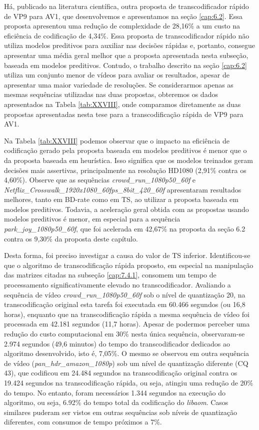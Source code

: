 Há, publicado na literatura científica, outra proposta de transcodificador rápido de VP9 para AV1, que desenvolvemos e apresentamos na seção \ref{cap:6.2}. Essa proposta apresentou uma redução de complexidade de 28,16\% a um custo na eficiência de codificação de 4,34\%. Essa proposta de transcodificador rápido não utiliza modelos preditivos para auxiliar nas decisões rápidas e, portanto, consegue apresentar uma média geral melhor que a proposta apresentada nesta subseção, baseada em modelos preditivos. Contudo, o trabalho descrito na seção \ref{cap:6.2} utiliza um conjunto menor de vídeos para avaliar os resultados, apesar de apresentar uma maior variedade de resoluções. Se considerarmos apenas as mesmas sequências utilizadas nas duas propostas, obteremos os dados apresentados na Tabela \ref{tab:XXVIII}, onde comparamos diretamente as duas propostas apresentadas nesta tese para a transcodificação rápida de VP9 para AV1.



Na Tabela \ref{tab:XXVIII} podemos observar que o impacto na eficiência de codificação gerado pela proposta baseada em modelos preditivos é menor que o da proposta baseada em heurística. Isso significa que os modelos treinados geram decisões mais assertivas, principalmente na resolução HD1080 (2,91\% contra os 4,60\%). Observe que as sequências \textit{crowd\_run\_1080p50\_60f} e \textit{Netflix\_Crosswalk\_1920x1080\_60fps\_8bit\_420\_60f} apresentaram resultados melhores, tanto em BD-rate como em TS, ao utilizar a proposta baseada em modelos preditivos. Todavia, a aceleração geral obtida com as propostas usando modelos preditivos é menor, em especial para a sequência \textit{park\_joy\_1080p50\_60f}, que foi acelerada em 42,67\% na proposta da seção 6.2 contra os 9,30\% da proposta deste capítulo.

Desta forma, foi preciso investigar a causa do valor de TS inferior. Identificou-se que o algoritmo de transcodificação rápida proposto, em especial na manipulação das matrizes citadas na subseção \ref{cap:7.4.1}, consomem um tempo de processamento significativamente elevado no transcodificador. Avaliando a sequência de vídeo \textit{crowd\_run\_1080p50\_60f} sob o nível de quantização 20, na transcodificação original esta tarefa foi executada em 60.466 segundos (ou 16,8 horas), enquanto que na transcodificação rápida a mesma sequência de vídeo foi processada em 42.181 segundos (11,7 horas). Apesar de podermos perceber uma redução do custo computacional em 30\% nesta única sequência, observaram-se 2.974 segundos (49,6 minutos) do tempo do transcodificador dedicados ao algoritmo desenvolvido, isto é, 7,05\%. O mesmo se observou em outra sequência de vídeo (\textit{pan\_hdr\_amazon\_1080p}) sob um nível de quantização diferente (CQ 43), que codificou em 24.484 segundos na transcodificação original contra os 19.424 segundos na transcodificação rápida, ou seja, atingiu uma redução de 20\% do tempo. No entanto, foram necessários 1.344 segundos na execução do algoritmo, ou seja, 6.92\% do tempo total da codificação do \textit{libaom}. Casos similares puderam ser vistos em outras sequências sob níveis de quantização diferentes, com consumos de tempo próximos a 7\%.

